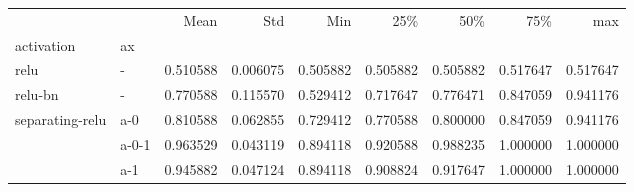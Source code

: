 \begin{tabular}{llrrrrrrr}
\toprule
                &     &      Mean &       Std &       Min &       25\% &       50\% &       75\% &       max \\
activation & ax &           &           &           &           &           &           &           \\
\midrule
relu & - &  0.510588 &  0.006075 &  0.505882 &  0.505882 &  0.505882 &  0.517647 &  0.517647 \\
relu-bn & - &  0.770588 &  0.115570 &  0.529412 &  0.717647 &  0.776471 &  0.847059 &  0.941176 \\
separating-relu & a-0 &  0.810588 &  0.062855 &  0.729412 &  0.770588 &  0.800000 &  0.847059 &  0.941176 \\
                & a-0-1 &  0.963529 &  0.043119 &  0.894118 &  0.920588 &  0.988235 &  1.000000 &  1.000000 \\
                & a-1 &  0.945882 &  0.047124 &  0.894118 &  0.908824 &  0.917647 &  1.000000 &  1.000000 \\
\bottomrule
\end{tabular}

